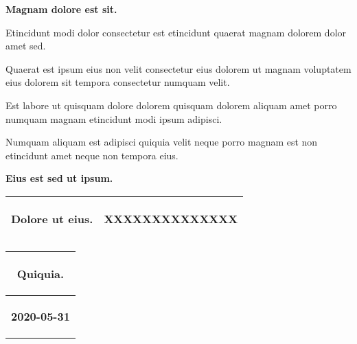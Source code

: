\documentclass[a4paper,landscape]{article}%
\begin{document}
%
\pagestyle{empty}%
\normalsize%
\begin{center}%
\begin{footnotesize}%
\textbf{Magnam dolore est sit.}%
\end{footnotesize}%
\begin{footnotesize}%
Etincidunt modi dolor consectetur est etincidunt quaerat magnam dolorem dolor amet sed.%
\end{footnotesize}%
\linebreak%
\begin{footnotesize}%
Quaerat est ipsum eius non velit consectetur eius dolorem ut magnam voluptatem eius dolorem sit tempora consectetur numquam velit.%
\end{footnotesize}%
\linebreak%
\begin{footnotesize}%
Est labore ut quisquam dolore dolorem quisquam dolorem aliquam amet porro numquam magnam etincidunt modi ipsum adipisci.%
\end{footnotesize}%
\linebreak%
\begin{footnotesize}%
Numquam aliquam est adipisci quiquia velit neque porro magnam est non etincidunt amet neque non tempora eius.%
\end{footnotesize}%
\linebreak%
\linebreak%
\begin{large}%
\textbf{Eius est sed ut ipsum.}%
\end{large}%
\end{center}%
\hspace*{250pt}%
\renewcommand{\arraystretch}{1.8}%
\begin{tabular}{|l r|}%
\hline%
\begin{large}%
\textbf{Dolore ut eius.}%
\end{large}&\begin{large}%
\textbf{XXXXXXXXXXXXXX}%
\end{large}\\%
\hline%
\end{tabular}%
\hspace*{160pt}%
\renewcommand{\arraystretch}{1.8}%
\begin{tabular}{|c|}%
\hline%
\begin{footnotesize}%
Quiquia.%
\end{footnotesize}\\%
\hline%
\begin{small}%
\textbf{2020{-}05{-}31}%
\end{small}\\%
\hline%
\end{tabular}%
\end{document}
